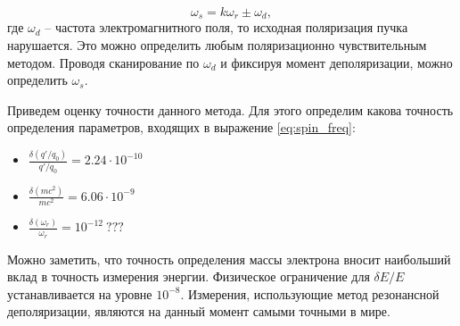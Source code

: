 \begin{equation}
\omega_s=  k\omega_{r} \pm \omega_d,
\end{equation}
где $\omega_d$ -- частота электромагнитного поля, то исходная поляризация пучка нарушается. Это можно определить любым поляризационно чувствительным методом. Проводя сканирование по $\omega_d$ и фиксируя момент деполяризации, можно определить $\omega_s$.
\par Приведем оценку точности данного метода. Для этого определим какова точность определения параметров, входящих в выражение \ref{eq:spin_freq}:
\begin{itemize}
	\item $\displaystyle \frac{\delta (q'/q_0)}{q'/q_0} = 2.24 \cdot 10^{-10} $ \cite{PDG}
	\item $\displaystyle \frac{\delta (mc^2)}{mc^2}= 6.06\cdot10^{-9} $ \cite{PDG}
	\item $\displaystyle \frac{\delta (\omega_r)}{\omega_r} = 10^{-12} ~???$
\end{itemize}
Можно заметить, что точность определения массы электрона вносит наибольший вклад в точность измерения энергии. Физическое ограничение для $\delta E/E$ устанавливается на уровне $10^{-8}$. Измерения, использующие метод резонансной деполяризации, являются на данный момент самыми точными в мире.
